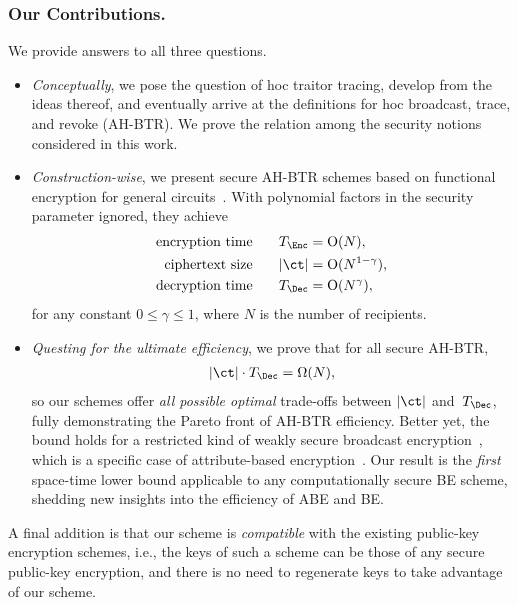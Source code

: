 \subsubsection{Our Contributions.}
We provide answers to all three questions.
\begin{itemize}
\item \emph{Conceptually}, we pose the question of \ad hoc traitor tracing,
develop from the ideas thereof, and
eventually arrive at the definitions for \ad hoc broadcast, trace, and revoke (AH-BTR)\@.
We prove the relation among the security notions considered in this work.
\item \emph{Construction-wise},
we present secure AH-BTR schemes based on functional encryption for general circuits~\cite{TCC:BonSahWat11}.
With polynomial factors in the security parameter ignored,
they achieve
\begin{align*}
\textup{encryption time}\qquad\qquad\mathllap{T_\Enc}&{}=\bigO(N),\\
\textup{ciphertext size}\qquad\qquad\mathllap{|\ct|}&{}=\bigO(N^{1-\gamma}),\\
\textup{decryption time}\qquad\qquad\mathllap{T_\Dec}&{}=\bigO(N^\gamma),
\end{align*}
for any constant ${0\leq\gamma\leq 1}$,
where $N$ is the number of recipients.
\item \emph{Questing for the ultimate efficiency},
we prove that for all secure AH-BTR,
\begin{align*}
|\ct|\cdot T_\Dec=\bigOmega(N),
\end{align*}
so our schemes offer \emph{all possible optimal} trade-offs between $|\ct|$ and~$T_\Dec$,
fully demonstrating the Pareto front of AH-BTR efficiency.
Better yet, the bound holds for a restricted kind of weakly secure broadcast encryption~\cite{C:FiaNao93},
which is a specific case of attribute-based encryption~\cite{EC:SahWat05,CCS:GPSW06}.
Our result is the \emph{first} space-time lower bound applicable to any computationally secure BE scheme,
shedding new insights into the efficiency of ABE and BE\@.
\end{itemize}
A final addition is that our scheme is \emph{compatible} with the existing public-key encryption schemes,
i.e., the keys of such a scheme can be those of any secure public-key encryption, and
there is no need to regenerate keys to take advantage of our scheme.

